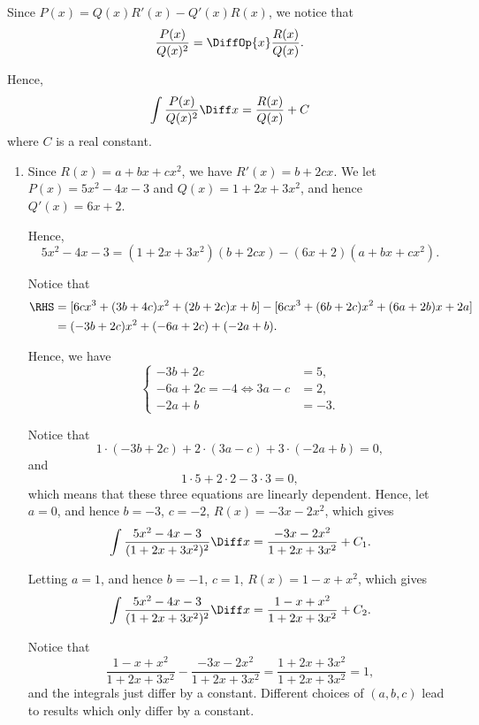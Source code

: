 \Question{\currfilebase}

Since \(P(x) = Q(x) R'(x) - Q'(x) R(x)\), we notice that
\[
    \frac{P(x)}{Q(x)^2} = \DiffOp{x} \frac{R(x)}{Q(x)}.
\]

Hence,
\[
    \int \frac{P(x)}{Q(x)^2} \Diff x = \frac{R(x)}{Q(x)} + C
\]
where \(C\) is a real constant.

\begin{enumerate}
    \item Since \(R(x) = a + bx + cx^2\), we have \(R'(x) = b + 2cx\). We let \(P(x) = 5x^2 - 4x - 3\) and \(Q(x) = 1 + 2x + 3x^2\), and hence \(Q'(x) = 6x + 2\).

          Hence,
          \[
              5x^2 - 4x - 3 = (1 + 2x + 3x^2)(b + 2cx) - (6x + 2)(a + bx + cx^2).
          \]

          Notice that
          \begin{align*}
              \RHS & = [6cx^3 + (3b + 4c) x^2 + (2b + 2c)x + b] - [6cx^3 + (6b + 2c)x^2 + (6a + 2b)x + 2a] \\
                   & = (-3b + 2c) x^2 + (-6a + 2c) + (-2a + b).
          \end{align*}

          Hence, we have
          \[
              \left\{
              \begin{aligned}
                  -3b + 2c                  & = 5,  \\
                  -6a + 2c = -4 \iff 3a - c & = 2,  \\
                  -2a + b                   & = -3.
              \end{aligned}
              \right.
          \]

          Notice that
          \[
              1 \cdot (-3b + 2c) + 2 \cdot (3a - c) + 3 \cdot (-2a + b) = 0,
          \]
          and
          \[
              1 \cdot 5 + 2 \cdot 2 - 3 \cdot 3 = 0,
          \]
          which means that these three equations are linearly dependent. Hence, let \(a = 0\), and hence \(b = -3\), \(c = -2\), \(R(x) = -3 x - 2x^2\), which gives
          \[
              \int \frac{5x^2 - 4x - 3}{(1 + 2x + 3x^2)^2} \Diff x = \frac{- 3x - 2x^2}{1 + 2x + 3x^2} + C_1.
          \]

          Letting \(a = 1\), and hence \(b = -1\), \(c = 1\), \(R(x) = 1 - x + x^2\), which gives
          \[
              \int \frac{5x^2 - 4x - 3}{(1 + 2x + 3x^2)^2} \Diff x = \frac{1 - x + x^2}{1 + 2x + 3x^2} + C_2.
          \]

          Notice that
          \[
              \frac{1 - x + x^2}{1 + 2x + 3x^2} - \frac{- 3x - 2x^2}{1 + 2x + 3x^2} = \frac{1 + 2x + 3x^2}{1 + 2x + 3x^2} = 1,
          \]
          and the integrals just differ by a constant. Different choices of \((a, b, c)\) lead to results which only differ by a constant.


\end{enumerate}
